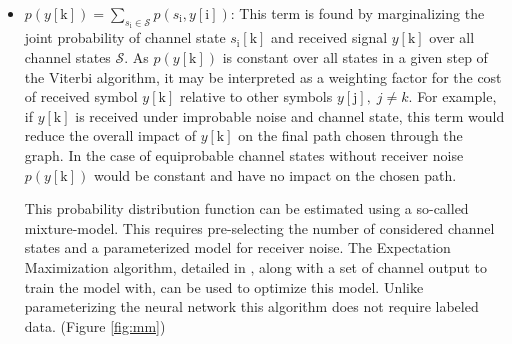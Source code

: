 \begin{itemize}
\item $p(y[\mathrm{k}]) = \sum_{s_{\mathrm{i}} \in \textit{$\mathcal{S}$}}p(s_{\mathrm{i}},y[\mathrm{i}])$: This term is found by marginalizing the joint probability of channel state $s_{\mathrm{i}}[\mathrm{k}]$ and received signal $y[\mathrm{k}]$ over all channel states $\mathcal{S}$. As $p(y[\mathrm{k}])$ is constant over all states in a given step of the Viterbi algorithm, it may be interpreted as a weighting factor for the cost of received symbol $y[\mathrm{k}]$ relative to other symbols $y[\mathrm{j}], \; j\neq k$. For example, if $y[\mathrm{k}]$ is received under improbable noise and channel state, this term would reduce the overall impact of $y[\mathrm{k}]$ on the final path chosen through the graph. In the case of equiprobable channel states without receiver noise $p(y[\mathrm{k}])$ would be constant and have no impact on the chosen path.
\par
This probability distribution function can be estimated using a so-called mixture-model. This requires pre-selecting the number of considered channel states and a parameterized model for receiver noise. The Expectation Maximization algorithm, detailed in \cite{ng2000cs229}, along with a set of channel output to train the model with, can be used to optimize this model. Unlike parameterizing the neural network this algorithm does not require labeled data. 
 (Figure \ref{fig:mm})
%
%



\end{itemize}
